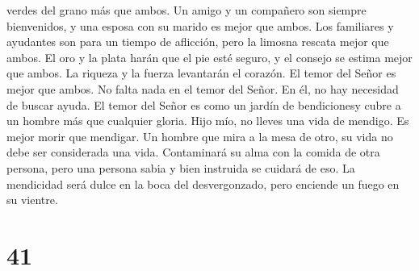 verdes del grano más que ambos.  Un amigo y un compañero
son siempre bienvenidos, y una esposa con su marido es mejor que ambos.
 Los familiares y ayudantes son para un tiempo de
aflicción, pero la limosna rescata mejor que ambos.  El
oro y la plata harán que el pie esté seguro, y el consejo se estima
mejor que ambos.  La riqueza y la fuerza levantarán el
corazón. El temor del Señor es mejor que ambos. No falta nada en el
temor del Señor. En él, no hay necesidad de buscar ayuda.
 El temor del Señor es como un jardín de bendicionesy
cubre a un hombre más que cualquier gloria.  Hijo mío, no
lleves una vida de mendigo. Es mejor morir que mendigar. 
Un hombre que mira a la mesa de otro, su vida no debe ser considerada
una vida. Contaminará su alma con la comida de otra persona, pero una
persona sabia y bien instruida se cuidará de eso.  La
mendicidad será dulce en la boca del desvergonzado, pero enciende un
fuego en su vientre.

\hypertarget{section-40}{%
\section{41}\label{section-40}}

